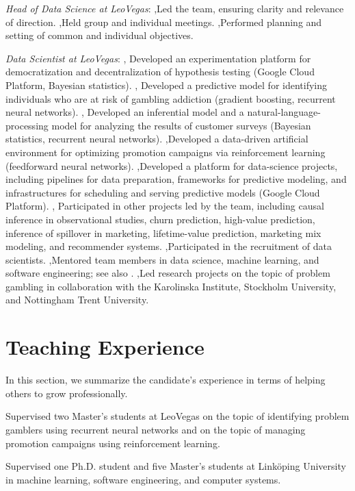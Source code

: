 \documentclass[journal]{IEEEtran}
\begin{document}
\date{November 2019--February 2022} \emph{Head of Data Science at LeoVegas}:
\sep Led the team, ensuring clarity and relevance of direction. \sep Held group
and individual meetings. \sep Performed planning and setting of common and
individual objectives.

\date{February 2018--February 2022} \emph{Data Scientist at LeoVegas}: \sep
Developed an experimentation platform for democratization and decentralization
of hypothesis testing (Google Cloud Platform, Bayesian statistics). \sep
Developed a predictive model for identifying individuals who are at risk of
gambling addiction (gradient boosting, recurrent neural networks). \sep
Developed an inferential model and a natural-language-processing model for
analyzing the results of customer surveys (Bayesian statistics, recurrent neural
networks). \sep Developed a data-driven artificial environment for optimizing
promotion campaigns via reinforcement learning (feedforward neural networks).
\sep Developed a platform for data-science projects, including pipelines for
data preparation, frameworks for predictive modeling, and infrastructures for
scheduling and serving predictive models (Google Cloud Platform). \sep
Participated in other projects led by the team, including causal inference in
observational studies, churn prediction, high-value prediction, inference of
spillover in marketing, lifetime-value prediction, marketing mix modeling, and
recommender systems. \sep Participated in the recruitment of data scientists.
\sep Mentored team members in data science, machine learning, and software
engineering; see also . \sep Led research projects on the topic
of problem gambling in collaboration with the Karolinska Institute, Stockholm
University, and Nottingham Trent University.

\section{Teaching Experience} 

In this section, we summarize the candidate's experience in terms of helping
others to grow professionally.

\date{2018--2019} Supervised two Master's students at LeoVegas on the topic of
identifying problem gamblers using recurrent neural networks and on the topic of
managing promotion campaigns using reinforcement learning.

\date{2011--2017} Supervised one Ph.D. student and five Master's students at
Linköping University in machine learning, software engineering, and computer
systems.
\end{document}
